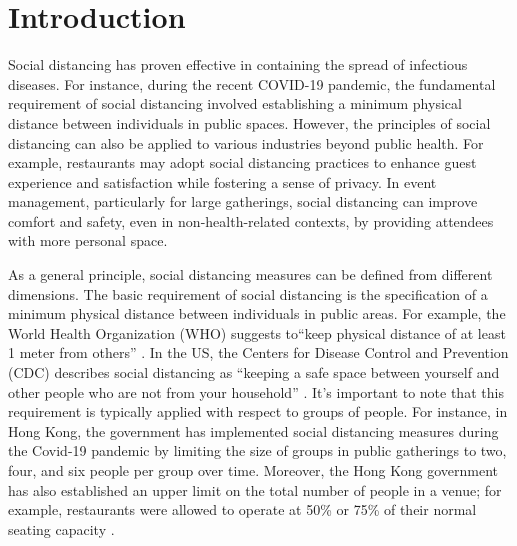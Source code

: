 




\section{Introduction}
Social distancing has proven effective in containing the spread of infectious diseases. For instance, during the recent COVID-19 pandemic, the fundamental requirement of social distancing involved establishing a minimum physical distance between individuals in public spaces. However, the principles of social distancing can also be applied to various industries beyond public health.
For example, restaurants may adopt social distancing practices to enhance guest experience and satisfaction while fostering a sense of privacy. In event management, particularly for large gatherings, social distancing can improve comfort and safety, even in non-health-related contexts, by providing attendees with more personal space.


As a general principle, social distancing measures can be defined from different dimensions. The basic requirement of social distancing is the specification of a minimum physical distance between individuals in public areas. For example, the World Health Organization (WHO) suggests to``keep physical distance of at least 1 meter from others'' \citep{AdviceforPublic}. In the US, the Centers for Disease Control and Prevention (CDC) describes social distancing as ``keeping a safe space between yourself and other people who are not from your household'' \citep{CDC}. 
It's important to note that this requirement is typically applied with respect to groups of people. For instance, in Hong Kong, the government has implemented social distancing measures during the Covid-19 pandemic by limiting the size of groups in public gatherings to two, four, and six people per group over time. Moreover, the Hong Kong government has also established an upper limit on the total number of people in a venue; for example, restaurants were allowed to operate at 50\% or 75\% of their normal seating capacity \citep{Gov202003}. 


